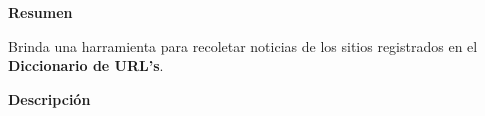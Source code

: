 
\begin{large}
	\textbf{Resumen}\\
\end{large}

Brinda una harramienta para recoletar noticias de los sitios registrados en el \textbf{Diccionario de URL's}.\\

\begin{large}
	\textbf{Descripción}\\
\end{large} 


